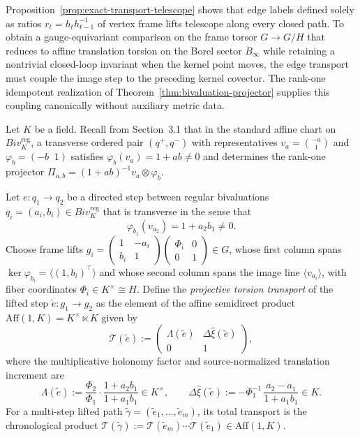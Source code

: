 Proposition~\ref{prop:exact-transport-telescope} shows that edge labels defined solely as ratios
$r_t = h_t h_{t-1}^{-1}$ of vertex frame lifts telescope along every closed path.
To obtain a gauge-equivariant comparison on the frame torsor $G\to G/H$ that reduces
to affine translation torsion on the Borel sector $B_\infty$ while retaining a
nontrivial closed-loop invariant when the kernel point moves, the edge transport
must couple the image step to the preceding kernel covector. The rank-one idempotent
realization of Theorem~\ref{thm:bivaluation-projector} supplies this coupling
canonically without auxiliary metric data.

Let $K$ be a field. Recall from Section~3.1 that in the standard affine chart on
$Biv_K^{\mathrm{reg}}$, a transverse ordered pair $(q^+,q^-)$ with representatives
$v_a = \binom{-a}{1}$ and $\varphi_b = (-b\;\;1)$ satisfies $\varphi_b(v_a)=1+ab\neq 0$
and determines the rank-one projector $\Pi_{a,b} = (1+ab)^{-1} v_a\otimes\varphi_b$.

\begin{definition}
\label{def:projective-edge-transport}
Let $e: q_1\to q_2$ be a directed step between regular bivaluations
$q_i=(a_i,b_i)\in Biv_K^{\mathrm{reg}}$ that is transverse in the sense that
\[
  \varphi_{b_1}(v_{a_2}) = 1 + a_2 b_1 \neq 0.
\]
Choose frame lifts
$g_i = \begin{pmatrix} 1 & -a_i \\ b_i & 1 \end{pmatrix}
\begin{pmatrix} \Phi_i & 0 \\ 0 & 1 \end{pmatrix} \in G$, whose first column spans
$\ker\varphi_{b_i}=\langle(1,b_i)^\top\rangle$ and whose second column spans the
image line $\langle v_{a_i}\rangle$, with fiber coordinates
$\Phi_i\in K^\times \cong H$. Define the \emph{projective torsion transport} of the
lifted step $\tilde{e}: g_1\to g_2$ as the element of the affine semidirect product
$\mathrm{Aff}(1,K) = K^\times \ltimes K$ given by
\begin{equation}\label{eq:projective-torsion-matrix}
  \mathcal{T}(\tilde{e}) :=
  \begin{pmatrix}
    \Lambda(\tilde{e}) & \Delta\hat{\xi}(\tilde{e}) \\[4pt]
    0 & 1
  \end{pmatrix},
\end{equation}
where the multiplicative holonomy factor and source-normalized translation increment are
\begin{equation}\label{eq:projective-torsion-components}
  \Lambda(\tilde{e}) := \frac{\Phi_2}{\Phi_1}\cdot \frac{1 + a_2 b_1}{1 + a_1 b_1} \in K^\times,
  \qquad
  \Delta\hat{\xi}(\tilde{e}) := -\Phi_1^{-1}\,\frac{a_2 - a_1}{1 + a_1 b_1} \in K.
\end{equation}
For a multi-step lifted path $\tilde{\gamma}=(\tilde{e}_1,\dots,\tilde{e}_m)$, its
total transport is the chronological product
$\mathcal{T}(\tilde{\gamma}) := \mathcal{T}(\tilde{e}_m)\cdots\mathcal{T}(\tilde{e}_1)
\in\mathrm{Aff}(1,K)$.
\end{definition}

